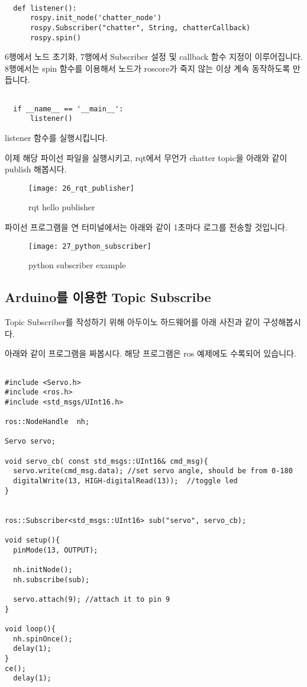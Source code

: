 \documentclass[11pt,fleqn]{book} %
\begin{document}
\begin{verbatim}

  def listener():
      rospy.init_node('chatter_node')
      rospy.Subscriber("chatter", String, chatterCallback)
      rospy.spin()

\end{verbatim}

6행에서 노드 초기화, 7행에서 Subscriber 설정 및 callback 함수 지정이 이루어집니다.
8행에서는 spin 함수를 이용해서 노드가 roscore가 죽지 않는 이상 계속 동작하도록 만듭니다.

\begin{verbatim}

  if __name__ == '__main__':
      listener()

\end{verbatim}

listener 함수를 실행시킵니다.

이제 해당 파이선 파일을 실행시키고, rqt에서 무언가 chatter topic을 아래와 같이 publish 해봅시다.

\begin{figure}[h]
\centering\texttt{[image: 26\_rqt\_publisher]}
\caption{rqt hello publisher}
\end{figure}

파이선 프로그램을 연 터미널에서는 아래와 같이 1초마다 로그를 전송할 것입니다.

\begin{figure}[h]
\centering\texttt{[image: 27\_python\_subscriber]}
\caption{python subscriber example}
\end{figure}

\subsection{Arduino를 이용한 Topic Subscribe}

Topic Subscriber를 작성하기 위해 아두이노 하드웨어를 아래 사진과 같이 구성해봅시다.

아래와 같이 프로그램을 짜봅시다. 해당 프로그램은 ros 예제에도 수록되어 있습니다.

\begin{verbatim}

#include <Servo.h>
#include <ros.h>
#include <std_msgs/UInt16.h>

ros::NodeHandle  nh;

Servo servo;

void servo_cb( const std_msgs::UInt16& cmd_msg){
  servo.write(cmd_msg.data); //set servo angle, should be from 0-180
  digitalWrite(13, HIGH-digitalRead(13));  //toggle led
}


ros::Subscriber<std_msgs::UInt16> sub("servo", servo_cb);

void setup(){
  pinMode(13, OUTPUT);

  nh.initNode();
  nh.subscribe(sub);

  servo.attach(9); //attach it to pin 9
}

void loop(){
  nh.spinOnce();
  delay(1);
}
ce();
  delay(1);
\end{verbatim}
\end{document}
